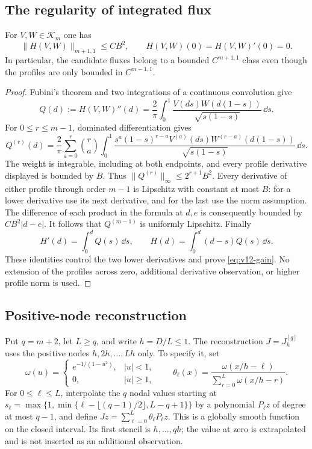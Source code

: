 \subsection{The regularity of integrated flux}
\begin{lemma}
\label{lem:v12-gain}
For $V,W\in\mathcal K_m$ one has
\begin{equation}\label{eq:v12-gain}
 \|H(V,W)\|_{m+1,1}\le C B^2,
 \qquad H(V,W)(0)=H(V,W)'(0)=0.
\end{equation}
In particular, the candidate fluxes belong to a bounded
$C^{m+1,1}$ class even though the profiles are only bounded in
$C^{m-1,1}$.
\end{lemma}
\begin{proof}
Fubini's theorem and two integrations of a continuous convolution give
\begin{equation}\label{eq:v12-second-derivative}
 Q(d):=H(V,W)''(d)=\frac2\pi\int_0^1
             \frac{V(ds)W(d(1-s))}{\sqrt{s(1-s)}}\,\dd s.
\end{equation}
For $0\le r\le m-1$, dominated differentiation gives
\[
 Q^{(r)}(d)=\frac2\pi\sum_{a=0}^r\binom ra
  \int_0^1\frac{s^a(1-s)^{r-a}
       V^{(a)}(ds)W^{(r-a)}(d(1-s))}{\sqrt{s(1-s)}}\,\dd s.
\]
The weight is integrable, including at both endpoints, and every
profile derivative displayed is bounded by $B$. Thus
$\|Q^{(r)}\|_\infty\le2^{r+1}B^2$. Every derivative of either
profile through order $m-1$ is Lipschitz with constant at most $B$:
for a lower derivative use its next derivative, and for the last use
the norm assumption. The difference of each product in the formula
at $d,e$ is consequently bounded by $C B^2|d-e|$.
It follows that $Q^{(m-1)}$ is uniformly Lipschitz.
Finally
\[
 H'(d)=\int_0^d Q(s)\,\dd s,\qquad
 H(d)=\int_0^d(d-s)Q(s)\,\dd s.
\]
These identities control the two lower derivatives and prove
\eqref{eq:v12-gain}. No extension of the profiles across zero,
additional derivative observation, or higher profile norm is used.
\end{proof}

\subsection{Positive-node reconstruction}
Put $q=m+2$, let $L\ge q$, and write $h=D/L\le1$.
The reconstruction $J=J_h^{[q]}$ uses the positive nodes
$h,2h,\ldots,Lh$ only. To specify it, set
\[
 \omega(u)=\begin{cases}e^{-1/(1-u^2)},&|u|<1,\\0,&|u|\ge1,
              \end{cases}\qquad
 \theta_\ell(x)=\frac{\omega(x/h-\ell)}
                         {\sum_{r=0}^L\omega(x/h-r)}.
\]
For $0\le\ell\le L$, interpolate the $q$ nodal values starting at
$s_\ell=\max\{1,\min\{\ell-\lfloor(q-1)/2\rfloor,L-q+1\}\}$
by a polynomial $P_\ell z$ of degree at most $q-1$, and define
$Jz=\sum_{\ell=0}^L\theta_\ell P_\ell z$.
This is a globally smooth function on the closed interval. Its first
stencil is $h,\ldots,qh$; the value at zero is extrapolated and is
not inserted as an additional observation.

